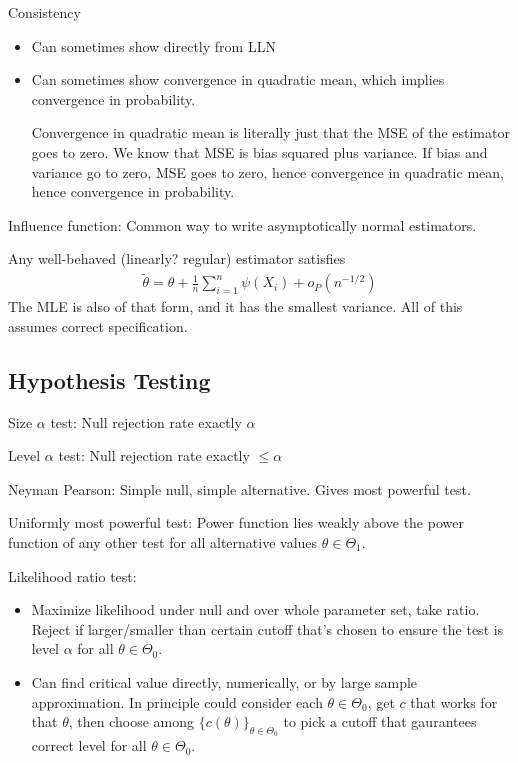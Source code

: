 \documentclass[12pt]{article}
\theoremstyle{plain}
\theoremstyle{definition}
\theoremstyle{remark}
\newcommand{\sumin}{\sum^n_{i=1}}
\begin{document}
Consistency
\begin{itemize}
  \item Can sometimes show directly from LLN
  \item Can sometimes show convergence in quadratic mean, which implies
    convergence in probability.

    Convergence in quadratic mean is literally just that the MSE of the
    estimator goes to zero.
    We know that MSE is bias squared plus variance.
    If bias and variance go to zero, MSE goes to zero, hence convergence
    in quadratic mean, hence convergence in probability.
\end{itemize}
Influence function:
Common way to write asymptotically normal estimators.


Any well-behaved (linearly? regular) estimator satisfies
\begin{align*}
  \tilde{\theta}
  =
  \theta
  +
  \frac{1}{n}
  \sumin
  \psi(X_i)
  +
  o_P(n^{-1/2})
\end{align*}
The MLE is also of that form, and it has the smallest variance.
All of this assumes correct specification.



\subsection{Hypothesis Testing}

Size $\alpha$ test: Null rejection rate exactly $\alpha$

Level $\alpha$ test: Null rejection rate exactly $\leq \alpha$

Neyman Pearson: Simple null, simple alternative.
Gives most powerful test.

Uniformly most powerful test: Power function lies weakly above the power
function of any other test for all alternative values
$\theta\in\Theta_1$.

Likelihood ratio test:
\begin{itemize}
  \item Maximize likelihood under null and over whole parameter set,
    take ratio. Reject if larger/smaller than certain cutoff that's
    chosen to ensure the test is level $\alpha$ for all
    $\theta\in\Theta_0$.
  \item Can find critical value directly, numerically, or by large
    sample approximation.
    In principle could consider each $\theta\in\Theta_0$, get $c$ that
    works for that $\theta$, then choose among
    $\{c(\theta)\}_{\theta\in\Theta_0}$ to pick a cutoff that gaurantees
    correct level for all $\theta\in\Theta_0$.
\end{itemize}
\end{document}
